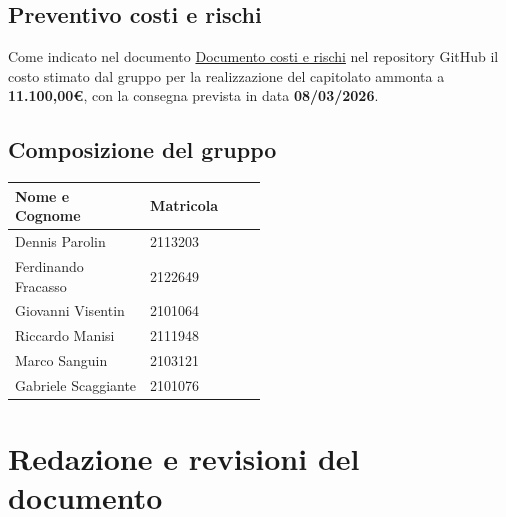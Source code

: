 \documentclass[a4paper,12pt]{article}
\begin{document}
\subsection{Preventivo costi e rischi}
Come indicato nel documento \href{URL}{Documento costi e rischi} nel repository GitHub il costo stimato dal gruppo per la realizzazione del capitolato ammonta a \textbf{11.100,00€}, con la consegna prevista in data \textbf{08/03/2026}.

\subsection{Composizione del gruppo}

\begin{center}
\small
\renewcommand{\arraystretch}{1.2}
\begin{tabular}{|p{0.3\linewidth}|p{0.2\linewidth}|}
\hline
\rowcolor{gray!60}
\textbf{Nome e Cognome} & \textbf{Matricola} \\
\hline
Dennis Parolin & 2113203 \\
\hline
Ferdinando Fracasso & 2122649 \\
\hline
Giovanni Visentin & 2101064 \\
\hline
Riccardo Manisi & 2111948 \\
\hline
Marco Sanguin & 2103121 \\
\hline
Gabriele Scaggiante & 2101076 \\
\hline
\end{tabular}
\end{center}

\clearpage
\section{Redazione e revisioni del documento}
\end{document}
